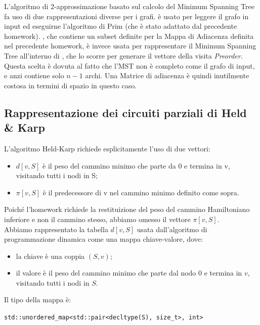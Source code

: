 \noindent L'algoritmo di $2$-approssimazione basato sul calcolo del Minimum Spanning Tree fa uso di due rappresentazioni diverse per i grafi.
 è usato per leggere il grafo in input ed eseguirne l'algoritmo di Prim (che è stato adattato dal precedente homework). , che contiene un subset definite per la Mappa di Adiacenza definita nel precedente homework, è invece usata per rappresentare il Minimum Spanning Tree all'interno di , che lo scorre per generare il vettore della visita \textit{Preorder}. Questa scelta è dovuta al fatto che l'MST non è completo come il grafo di input, e anzi contiene solo $n - 1$ archi. Una Matrice di adiacenza è quindi inutilmente costosa in termini di spazio in questo caso.

\newpage
\subsection{Rappresentazione dei circuiti parziali di Held \& Karp}
\label{held-karp-repr-S}

L'algoritmo Held-Karp richiede esplicitamente l'uso di due vettori:
\begin{itemize}
    \item $d[v,S]$ è il peso del cammino minimo che parte da 0 e termina in v, visitando tutti i nodi in S;
    \item $\pi[v,S]$ è il predecessore di v nel cammino minimo definito come sopra.
\end{itemize}

\noindent Poiché l'homework richiede la restituizione del peso del cammino Hamiltoniano inferiore e non il cammino stesso, abbiamo omesso il vettore $\pi[v,S]$. \\

Abbiamo rappresentato la tabella $d[v,S]$ usata dall'algoritmo di programmazione dinamica come una mappa chiave-valore, dove:

\begin{itemize}
    \item la chiave è una coppia $(S, v)$;
    \item il valore è il peso del cammino minimo che parte dal nodo 0 e termina in $v$, visitando tutti i nodi in $S$.
\end{itemize}

\noindent Il tipo della mappa è:

\begin{center}
    \texttt{std::unordered_map<std::pair<decltype(S), size_t>, int>}
\end{center}

